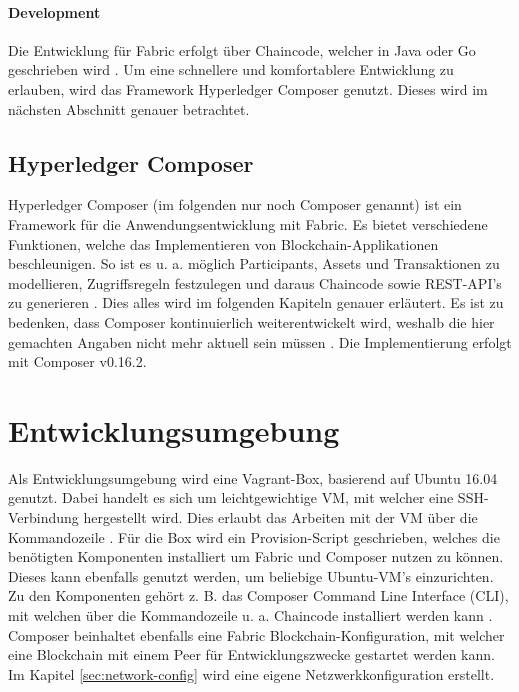 \paragraph{Development}
Die Entwicklung für Fabric erfolgt über Chaincode, welcher in Java oder Go geschrieben wird \cite{HyperledgerFabricTeamSDKsHyperledgerFabric}. Um eine schnellere und komfortablere Entwicklung zu erlauben, wird das Framework Hyperledger Composer genutzt. Dieses wird im nächsten Abschnitt genauer betrachtet.


\subsection{Hyperledger Composer}
Hyperledger Composer (im folgenden nur noch Composer genannt) ist ein Framework für die Anwendungsentwicklung mit Fabric. Es bietet verschiedene Funktionen, welche das Implementieren von Blockchain-Applikationen beschleunigen. So ist es u. a. möglich Participants, Assets und Transaktionen zu modellieren, Zugriffsregeln festzulegen und daraus Chaincode sowie REST-API's zu generieren \cite{HyperledgerComposerTeamIntroductionHyperledgerComposer}. Dies alles wird im folgenden Kapiteln genauer erläutert. Es ist zu bedenken, dass Composer kontinuierlich weiterentwickelt wird, weshalb die hier gemachten Angaben nicht mehr aktuell sein müssen \cite{HyperledgerComposerTeamHyperledgerComposerReleases2018}. Die Implementierung erfolgt mit Composer v0.16.2.

\section{Entwicklungsumgebung}
Als Entwicklungsumgebung wird eine Vagrant-Box, basierend auf Ubuntu 16.04 genutzt. Dabei handelt es sich um leichtgewichtige VM, mit welcher eine SSH-Verbindung hergestellt wird. Dies erlaubt das Arbeiten mit der VM über die Kommandozeile \cite{VagrantTeamVagrantHashiCorp}. Für die Box wird ein Provision-Script geschrieben, welches die benötigten Komponenten installiert um Fabric und Composer nutzen zu können. Dieses kann ebenfalls genutzt werden, um beliebige Ubuntu-VM's einzurichten. Zu den Komponenten gehört z. B. das Composer Command Line Interface (CLI), mit welchen über die Kommandozeile u. a. Chaincode installiert werden kann \cite{HyperledgerComposerTeamDevelopmentEnvironmentHyperledger}. Composer beinhaltet ebenfalls eine Fabric Blockchain-Konfiguration, mit welcher eine Blockchain mit einem Peer für Entwicklungszwecke gestartet werden kann. Im Kapitel \ref{sec:network-config} wird eine eigene Netzwerkkonfiguration erstellt.

